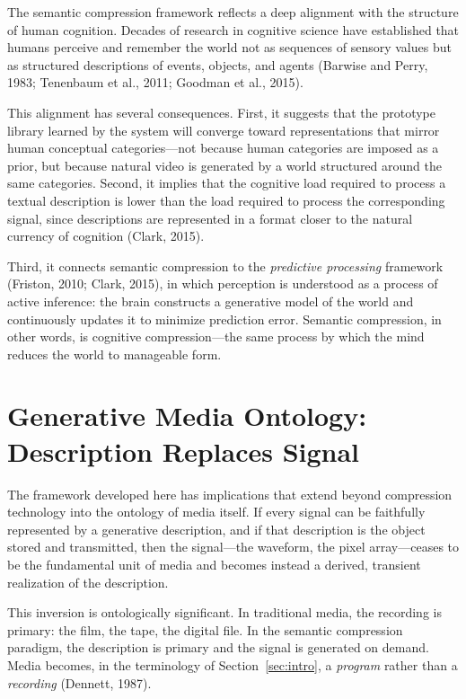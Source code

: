 \documentclass[11pt,a4paper]{article}
\theoremstyle{definition}
\theoremstyle{remark}
\begin{document}
The semantic compression framework reflects a deep alignment with the structure of human cognition. Decades of research in cognitive science have established that humans perceive and remember the world not as sequences of sensory values but as structured descriptions of events, objects, and agents (Barwise and Perry, 1983; Tenenbaum et al., 2011; Goodman et al., 2015).

This alignment has several consequences. First, it suggests that the prototype library learned by the system will converge toward representations that mirror human conceptual categories---not because human categories are imposed as a prior, but because natural video is generated by a world structured around the same categories. Second, it implies that the cognitive load required to process a textual description is lower than the load required to process the corresponding signal, since descriptions are represented in a format closer to the natural currency of cognition (Clark, 2015).

Third, it connects semantic compression to the \emph{predictive processing} framework (Friston, 2010; Clark, 2015), in which perception is understood as a process of active inference: the brain constructs a generative model of the world and continuously updates it to minimize prediction error. Semantic compression, in other words, is cognitive compression---the same process by which the mind reduces the world to manageable form.

\section{Generative Media Ontology: Description Replaces Signal}
\label{sec:ontology}

The framework developed here has implications that extend beyond compression technology into the ontology of media itself. If every signal can be faithfully represented by a generative description, and if that description is the object stored and transmitted, then the signal---the waveform, the pixel array---ceases to be the fundamental unit of media and becomes instead a derived, transient realization of the description.

This inversion is ontologically significant. In traditional media, the recording is primary: the film, the tape, the digital file. In the semantic compression paradigm, the description is primary and the signal is generated on demand. Media becomes, in the terminology of Section~\ref{sec:intro}, a \emph{program} rather than a \emph{recording} (Dennett, 1987).
\end{document}
